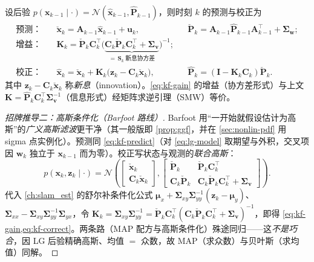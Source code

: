 \begin{theorem}[卡尔曼滤波]\label{thm:kf}
设后验 $p(\mathbf{x}_{k-1}\mid\cdot)=\mathcal{N}(\hat{\mathbf{x}}_{k-1},\hat{\mathbf{P}}_{k-1})$，则时刻 $k$ 的预测与校正为
\begin{align}
  \text{预测：}\quad
  &\check{\mathbf{x}}_k=\mathbf{A}_{k-1}\hat{\mathbf{x}}_{k-1}+\mathbf{u}_k, &
  &\check{\mathbf{P}}_k=\mathbf{A}_{k-1}\hat{\mathbf{P}}_{k-1}\mathbf{A}_{k-1}^\top+\boldsymbol{\Sigma}_{\mathbf{w}}; \label{eq:kf-predict}\\
  \text{增益：}\quad
  &\mathbf{K}_k=\check{\mathbf{P}}_k\mathbf{C}_k^\top\big(\underbrace{\mathbf{C}_k\check{\mathbf{P}}_k\mathbf{C}_k^\top+\boldsymbol{\Sigma}_{\mathbf{v}}}_{=\,\mathbf{S}_k\ \text{新息协方差}}\big)^{-1}; \label{eq:kf-gain}\\
  \text{校正：}\quad
  &\hat{\mathbf{x}}_k=\check{\mathbf{x}}_k+\mathbf{K}_k\big(\mathbf{z}_k-\mathbf{C}_k\check{\mathbf{x}}_k\big), &
  &\hat{\mathbf{P}}_k=(\mathbf{I}-\mathbf{K}_k\mathbf{C}_k)\check{\mathbf{P}}_k. \label{eq:kf-correct}
\end{align}
其中 $\mathbf{z}_k-\mathbf{C}_k\check{\mathbf{x}}_k$ 称\emph{新息}（innovation）。\cref{eq:kf-gain} 的增益（协方差形式）与上文 $\mathbf{K}=\hat{\mathbf{P}}_k\mathbf{C}_k^\top\boldsymbol{\Sigma}_{\mathbf{v}}^{-1}$（信息形式）经矩阵求逆引理（SMW）等价。
\end{theorem}
\begin{proof}[招牌推导二：高斯条件化（Barfoot 路线）]
Barfoot\cite{barfoot2024state} 用“一开始就假设估计为高斯”的\emph{广义高斯滤波}更干净（其一般版即 \cref{prop:ggf}，并在 \cref{sec:nonlin-pdf} 用 sigma 点实例化）。预测同 \cref{eq:kf-predict}（对 \cref{eq:lg-model} 取期望与外积，交叉项因 $\mathbf{w}_k$ 独立于 $\mathbf{x}_{k-1}$ 而为零）。校正写状态与观测的\emph{联合高斯}：
\[
  p(\mathbf{x}_k,\mathbf{z}_k\mid\cdot)=\mathcal{N}\!\left(\begin{bmatrix}\check{\mathbf{x}}_k\\\mathbf{C}_k\check{\mathbf{x}}_k\end{bmatrix},
  \begin{bmatrix}\check{\mathbf{P}}_k & \check{\mathbf{P}}_k\mathbf{C}_k^\top\\ \mathbf{C}_k\check{\mathbf{P}}_k & \mathbf{C}_k\check{\mathbf{P}}_k\mathbf{C}_k^\top+\boldsymbol{\Sigma}_{\mathbf{v}}\end{bmatrix}\right).
\]
代入 \cref{ch:slam_est} 的舒尔补条件化公式 $\boldsymbol{\mu}_{x}+\boldsymbol{\Sigma}_{xy}\boldsymbol{\Sigma}_{yy}^{-1}(\mathbf{z}_k-\boldsymbol{\mu}_y)$、$\boldsymbol{\Sigma}_{xx}-\boldsymbol{\Sigma}_{xy}\boldsymbol{\Sigma}_{yy}^{-1}\boldsymbol{\Sigma}_{yx}$，令 $\mathbf{K}_k=\boldsymbol{\Sigma}_{xy}\boldsymbol{\Sigma}_{yy}^{-1}=\check{\mathbf{P}}_k\mathbf{C}_k^\top(\mathbf{C}_k\check{\mathbf{P}}_k\mathbf{C}_k^\top+\boldsymbol{\Sigma}_{\mathbf{v}})^{-1}$，即得 \cref{eq:kf-gain,eq:kf-correct}。两条路（MAP 配方与高斯条件化）殊途同归——这\emph{不是巧合}，因 LG 后验精确高斯、均值 $=$ 众数，故 MAP（求众数）与贝叶斯（求均值）同解。
\end{proof}


